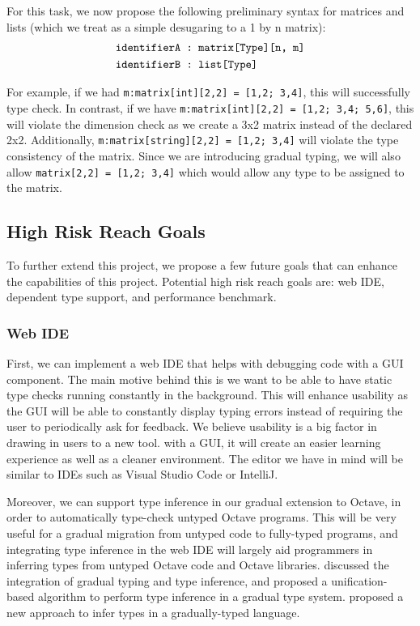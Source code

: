 For this task, we now propose the following preliminary syntax for matrices and lists (which we treat as a simple desugaring to a 1 by n matrix):
\begin{align*}
& \text{\tt identifierA : matrix[Type][n, m]} \\
& \text{\tt identifierB : list[Type]}
\end{align*}

For example, if we had {\tt m:matrix[int][2,2] = [1,2; 3,4]}, this will successfully type check. In contrast, if we have  {\tt m:matrix[int][2,2] = [1,2; 3,4; 5,6]}, this will violate the dimension check as we create a 3x2 matrix instead of the declared 2x2. Additionally, {\tt m:matrix[string][2,2] = [1,2; 3,4]} will violate the type consistency of the matrix. Since we are introducing gradual typing, we will also allow {\tt matrix[2,2] = [1,2; 3,4]} which would allow any type to be assigned to the matrix.

\subsection{High Risk Reach Goals}
To further extend this project, we propose a few future goals that can enhance the capabilities of this project. Potential high risk reach goals are: web IDE, dependent type support, and performance benchmark.

\subsubsection{Web IDE}
First, we can implement a web IDE that helps with debugging code with a GUI component. The main motive behind this is we want to be able to have static type checks running constantly in the background. This will enhance usability as the GUI will be able to constantly display typing errors instead of requiring the user to periodically ask for feedback. We believe usability is a big factor in drawing in users to a new tool. with a GUI, it will create an easier learning experience as well as a cleaner environment. The editor we have in mind will be similar to IDEs such as Visual Studio Code or IntelliJ.

Moreover, we can support type inference in our gradual extension to Octave, in order to automatically type-check untyped Octave programs. This will be very useful for a gradual migration from untyped code to fully-typed programs, and integrating type inference in the web IDE will largely aid programmers in inferring types from untyped Octave code and Octave libraries. \citet{siek2008gradual} discussed the integration of gradual typing and type inference, and proposed a unification-based algorithm to perform type inference in a gradual type system. \citet{garcia2015principal} proposed a new approach to infer types in a gradually-typed language. 

